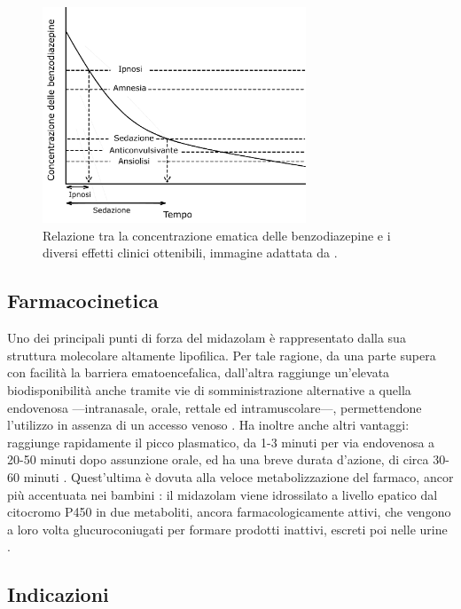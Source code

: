 \begin{figure}[t]
    \centering
    \includegraphics[width=0.7\textwidth]{Figure/figurabenzo.pdf}
    \caption{Relazione tra la concentrazione ematica delle benzodiazepine e i diversi effetti clinici ottenibili, immagine adattata da \cite{Olkkola2008}.}
    \label{fig:benzo}
\end{figure}

\subsection*{Farmacocinetica}

Uno dei principali punti di forza del midazolam è rappresentato dalla sua struttura molecolare altamente lipofilica. Per tale ragione, da una parte supera con facilità la barriera ematoencefalica, dall'altra raggiunge un'elevata biodisponibilità anche tramite vie di somministrazione alternative a quella endovenosa ---intranasale, orale, rettale ed intramuscolare---, permettendone l'utilizzo in assenza di un accesso venoso \cite{Krauss2006}. Ha inoltre anche altri vantaggi: raggiunge rapidamente il picco plasmatico, da 1-3 minuti per via endovenosa a 20-50 minuti dopo assunzione orale, ed ha una breve durata d'azione, di circa 30-60 minuti \cite{Simeupsedazione, Uptodatepharmacology}. 
Quest'ultima è dovuta alla veloce metabolizzazione del farmaco, ancor più accentuata nei bambini \cite{Payne1989}: il midazolam viene idrossilato a livello epatico dal citocromo P450 in due metaboliti, ancora farmacologicamente attivi, che vengono a loro volta glucuroconiugati per formare prodotti inattivi, escreti poi nelle urine \cite{Olkkola2008}. 

\subsection*{Indicazioni}

